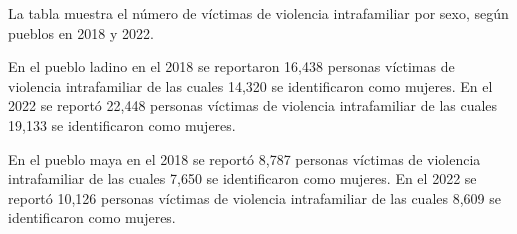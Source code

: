 La tabla muestra el número de víctimas de violencia intrafamiliar por sexo, según pueblos en 2018 y 2022. 

En el pueblo ladino en el 2018 se reportaron 16,438 personas víctimas de violencia intrafamiliar de las cuales 14,320 se identificaron como mujeres. En el 2022 se reportó 22,448 personas víctimas de violencia intrafamiliar de las cuales 19,133 se identificaron como mujeres.

En el pueblo maya en el 2018 se reportó 8,787 personas víctimas de violencia intrafamiliar de las cuales 7,650 se identificaron como mujeres. En el 2022 se reportó 10,126 personas víctimas de violencia intrafamiliar de las cuales 8,609 se identificaron como mujeres.